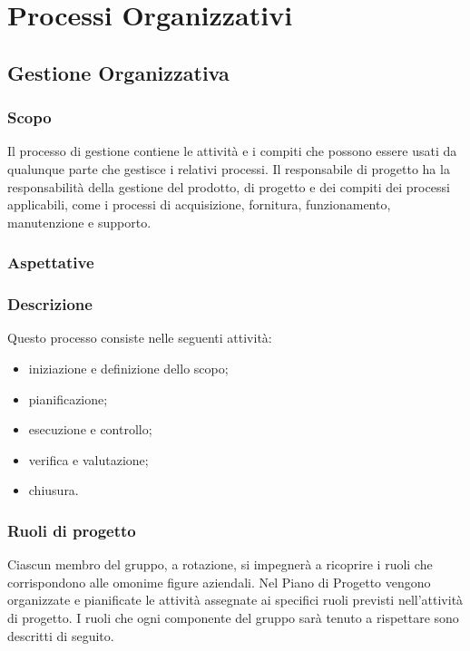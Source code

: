 \section{Processi Organizzativi}
	\subsection{Gestione Organizzativa}
		\subsubsection{Scopo}
		Il processo di gestione contiene le attività e i compiti  che possono essere usati da qualunque parte che gestisce i relativi processi. Il responsabile di  	progetto ha la responsabilità della gestione del prodotto, di progetto e dei compiti dei processi applicabili, come i processi di acquisizione, fornitura, funzionamento, manutenzione e supporto.
		\subsubsection{Aspettative}
		\subsubsection{Descrizione}
		Questo processo consiste nelle seguenti attività:
		\begin{itemize}
			\item iniziazione e definizione dello scopo;
			\item pianificazione;
			\item esecuzione e controllo;
			\item verifica e valutazione;
			\item chiusura.
		\end{itemize}
		\subsubsection{Ruoli di progetto}
		Ciascun membro del gruppo, a rotazione, si impegnerà a ricoprire i  ruoli che corrispondono alle omonime figure aziendali. Nel Piano di Progetto 	vengono organizzate e pianificate le attività assegnate ai specifici ruoli previsti nell'attività di progetto. I ruoli che ogni componente del gruppo sarà tenuto a rispettare sono descritti di seguito.
